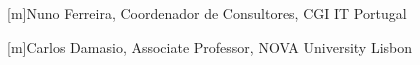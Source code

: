 

[m]{{Nuno Ferreira, Coordenador de Consultores, CGI IT Portugal}}


[m]{{Carlos Damasio, Associate Professor, NOVA University Lisbon}}


